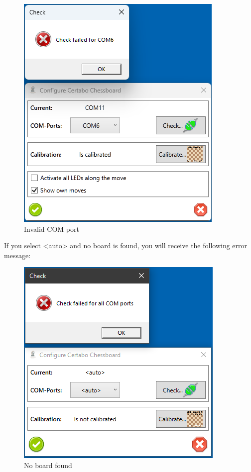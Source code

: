 \documentclass[11pt,a4paper]{article}
\begin{document}
\begin{figure}[H]
	\centering
	\includegraphics[scale=0.9]{Calibrate2.png}
	\caption{Invalid COM port }
	\label{fig:Calibrate2}
\end{figure}

If you select <auto> and no board is found, you will receive the following error message:

\begin{figure}[H]
	\centering
	\includegraphics[scale=0.9]{Calibrate3.png}
	\caption{No board found }
	\label{fig:Calibrate3}
\end{figure}
\end{document}
